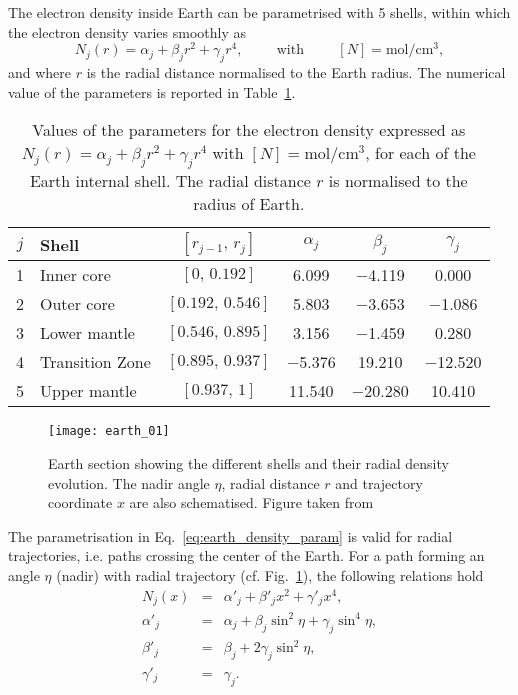 \documentclass{article}
\newcommand{\cm}[0]{\text{cm}}
\begin{document}
The electron density inside Earth can be parametrised with 5 shells, within which the electron density varies smoothly as~\cite{Lisi:1997yc}
\begin{equation}\label{eq:earth_density_param}
	N_j(r) = \alpha_j + \beta_j r^2 + \gamma_j r^4, \hspace{1cm} \text{with} \hspace{1cm} \left[N\right] = \text{mol}/\cm^3,
\end{equation}
and where $r$ is the radial distance normalised to the Earth radius. The numerical value of the parameters is reported in Table~\ref{tab:shell_parameters}.

\begin{table}[ht]
\begin{tabular}{clcccc}
\hline
\hline
$j$& Shell          & $[r_{j-1},\,r_j]$  &$\alpha_j$ &$\beta_j$ &$\gamma_j$\\
\hline
1 & Inner core      &     $[0,\,0.192]$    &   6.099 & $-$4.119 &    0.000 \\
2 & Outer core      &   $[0.192,\,0.546]$  &   5.803 & $-$3.653 & $-$1.086 \\
3 & Lower mantle    &   $[0.546,\,0.895]$  &   3.156 & $-$1.459 &    0.280 \\
4 & Transition Zone &   $[0.895,\,0.937]$  &$-$5.376 &   19.210 &$-$12.520 \\
5 & Upper mantle    &     $[0.937,\,1]$    &  11.540 &$-$20.280 &   10.410 \\
\hline 
\hline
\end{tabular}
\caption{\label{tab:shell_parameters}Values of the parameters for the electron density expressed as $N_j(r) = \alpha_j + \beta_j r^2 + \gamma_j r^4$ with $[N] = \text{mol}/\cm^3$, for each of the Earth internal shell. The radial distance $r$ is normalised to the radius of Earth.}
\end{table}

\begin{figure}[ht]
	\texttt{[image: earth\_01]}
	\caption{Earth section showing the different shells and their radial density evolution. The nadir angle $\eta$, radial distance $r$ and trajectory coordinate $x$ are also schematised. Figure taken from~\cite{Lisi:1997yc}}
	\label{fig:earth_density}	
\end{figure}

The parametrisation in Eq.~\ref{eq:earth_density_param} is valid for radial trajectories, i.e. paths crossing the center of the Earth. For a path forming an angle $\eta$ (nadir) with radial trajectory (cf. Fig.~\ref{fig:earth_density}), the following relations hold
\begin{eqnarray}
	N_j(x) &=& \alpha'_j + \beta'_j x^2 + \gamma'_j x^4, \label{eq:earth_density_nadir} \\
	\alpha'_j &=& \alpha_j + \beta_j \sin^2 \eta + \gamma_j \sin^4\eta, \\
	\beta'_j &=& \beta_j + 2 \gamma_j \sin^2\eta, \\
	\gamma'_j &=& \gamma_j.
\end{eqnarray}
\end{document}
